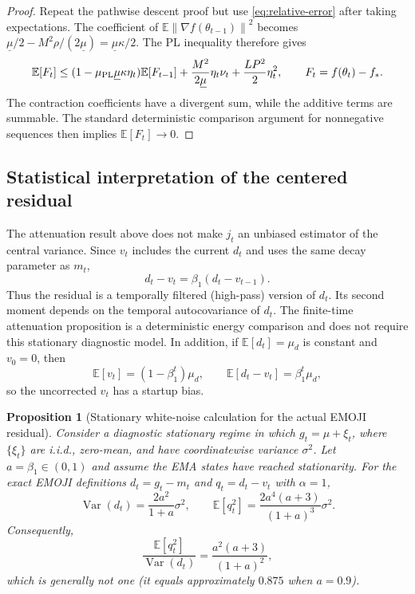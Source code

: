 \documentclass[11pt]{article}
\newtheorem{proposition}[theorem]{Proposition}
\newcommand{\E}{\mathbb{E}}
\newcommand{\norm}[1]{\left\lVert #1\right\rVert}
\begin{document}
\begin{proof}
Repeat the pathwise descent proof but use \eqref{eq:relative-error} after taking expectations. The coefficient of $\E\norm{\nabla f(\theta_{t-1})}^2$ becomes
$\underline\mu/2-M^2\rho/(2\underline\mu)=\underline\mu\kappa/2$. The PL inequality therefore gives
\[
 \E[F_t]\le(1-\mu_{\rm PL}\underline\mu\kappa\eta_t)\E[F_{t-1}]
 +\frac{M^2}{2\underline\mu}\eta_t\nu_t
 +\frac{LP^2}{2}\eta_t^2,
 \qquad F_t=f(\theta_t)-f_*.
\]
The contraction coefficients have a divergent sum, while the additive terms are summable. The standard deterministic comparison argument for nonnegative sequences then implies $\E[F_t]\to0$.
\end{proof}

\subsection{Statistical interpretation of the centered residual}
The attenuation result above does not make $j_t$ an unbiased estimator of the central variance. Since $v_t$ includes the current $d_t$ and uses the same decay parameter as $m_t$,
\[
 d_t-v_t=\beta_1(d_t-v_{t-1}).
\]
Thus the residual is a temporally filtered (high-pass) version of $d_t$. Its second moment depends on the temporal autocovariance of $d_t$. The finite-time attenuation proposition is a deterministic energy comparison and does not require this stationary diagnostic model. In addition, if $\E[d_t]=\mu_d$ is constant and $v_0=0$, then
\[
 \E[v_t]=(1-\beta_1^t)\mu_d,
 \qquad \E[d_t-v_t]=\beta_1^t\mu_d,
\]
so the uncorrected $v_t$ has a startup bias.

\begin{proposition}[Stationary white-noise calculation for the actual EMOJI residual]\label{prop:white-noise}
Consider a diagnostic stationary regime in which $g_t=\mu+\xi_t$, where $\{\xi_t\}$ are i.i.d., zero-mean, and have coordinatewise variance $\sigma^2$. Let $a=\beta_1\in(0,1)$ and assume the EMA states have reached stationarity. For the exact EMOJI definitions $d_t=g_t-m_t$ and $q_t=d_t-v_t$ with $\alpha=1$,
\begin{equation}
 \operatorname{Var}(d_t)=\frac{2a^2}{1+a}\sigma^2,
 \qquad
 \E[q_t^2]=\frac{2a^4(a+3)}{(1+a)^3}\sigma^2.
 \label{eq:white-noise}
\end{equation}
Consequently,
\begin{equation}
 \frac{\E[q_t^2]}{\operatorname{Var}(d_t)}
 =\frac{a^2(a+3)}{(1+a)^2},
 \label{eq:ratio}
\end{equation}
which is generally not one (it equals approximately $0.875$ when $a=0.9$).
\end{proposition}
\end{document}
